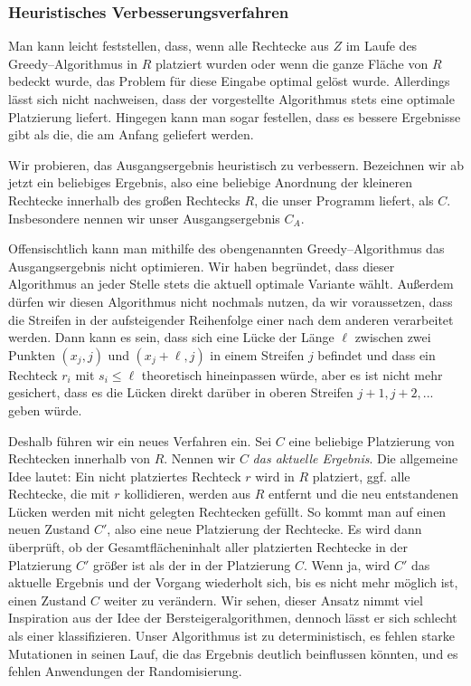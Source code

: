 \subsubsection{Heuristisches Verbesserungsverfahren}\label{sec:verbesserung}
Man kann leicht feststellen, dass, wenn alle Rechtecke aus $Z$ im Laufe des
Greedy--Algorithmus in $R$ platziert wurden oder wenn die ganze Fläche von $R$ bedeckt wurde, 
das Problem für diese Eingabe optimal gelöst wurde.
Allerdings lässt sich nicht nachweisen, dass der vorgestellte Algorithmus 
stets eine optimale Platzierung liefert.
Hingegen kann man sogar festellen, dass es bessere Ergebnisse gibt als die,
die am Anfang geliefert werden. 


Wir probieren, das Ausgangsergebnis heuristisch zu verbessern.
Bezeichnen wir ab jetzt ein beliebiges Ergebnis, also eine beliebige Anordnung
der kleineren Rechtecke innerhalb des großen Rechtecks $R$, die unser Programm liefert, 
als $C$. Insbesondere nennen wir unser Ausgangsergebnis $C_A$.


Offensischtlich kann man mithilfe des obengenannten Greedy--Algorithmus 
das Ausgangsergebnis nicht optimieren. Wir haben begründet, dass dieser Algorithmus
an jeder Stelle stets die aktuell optimale Variante wählt. 
Außerdem dürfen wir diesen Algorithmus nicht nochmals nutzen,
da wir voraussetzen, dass die Streifen in der aufsteigender Reihenfolge einer nach dem anderen
verarbeitet werden. Dann kann es sein, dass sich eine Lücke der Länge $\ell$
zwischen zwei Punkten $(x_j, j)$ und 
$(x_j + \ell, j)$ in einem Streifen $j$ befindet
und dass ein Rechteck $r_i$ mit $s_i \leqslant \ell$ theoretisch hineinpassen würde, aber
es ist nicht mehr gesichert, dass es die Lücken direkt darüber in oberen Streifen $j+1, j+2, ...$
geben würde.


Deshalb führen wir ein neues Verfahren ein. 
Sei $C$ eine beliebige Platzierung von Rechtecken innerhalb von $R$.
Nennen wir $C$ \textit{das aktuelle Ergebnis}. 
Die allgemeine Idee lautet:
Ein nicht platziertes Rechteck $r$ wird in $R$ platziert, ggf. 
alle Rechtecke, die mit $r$ kollidieren, werden aus $R$ entfernt und
die neu entstandenen Lücken werden mit nicht gelegten Rechtecken gefüllt. 
So kommt man auf einen neuen Zustand $C'$, also eine neue Platzierung der Rechtecke.
Es wird dann überprüft, ob der Gesamtflächeninhalt aller platzierten Rechtecke in der Platzierung $C'$
größer ist als der in der Platzierung $C$.
Wenn ja, wird $C'$ das aktuelle Ergebnis und der Vorgang wiederholt sich,
bis es nicht mehr möglich ist, einen Zustand $C$ weiter zu verändern.
Wir sehen, dieser Ansatz nimmt viel Inspiration aus der Idee der Bersteigeralgorithmen,
dennoch lässt er sich schlecht als einer klassifizieren.
Unser Algorithmus ist zu deterministisch,
es fehlen starke Mutationen in seinen Lauf, die das Ergebnis deutlich beinflussen könnten,
und es fehlen Anwendungen der Randomisierung.


